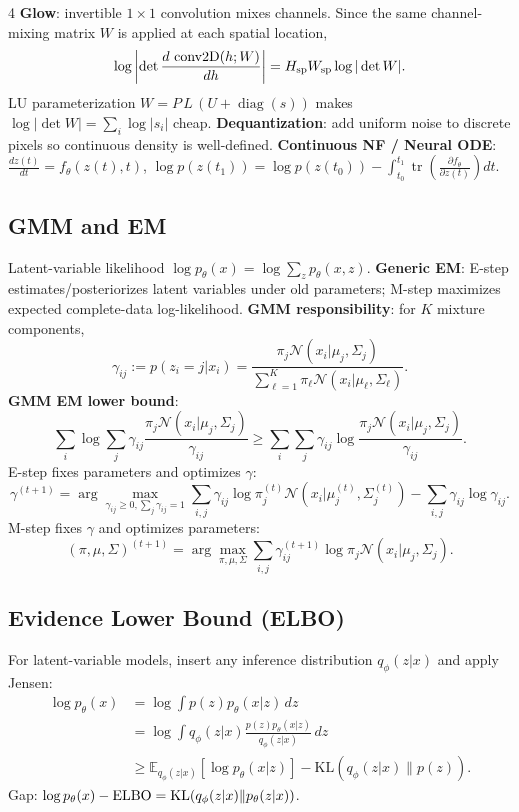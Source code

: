 \documentclass{article}
\newcommand{\key}[1]{\textbf{#1}}
\newcommand{\E}{\mathbb{E}}
\newcommand{\N}{\mathcal{N}}
\newcommand{\KL}{\mathrm{KL}}
\newcommand{\1}{\mathbf 1}
\DeclareMathOperator{\tr}{tr}
\begin{document}
\begin{multicols*}{4}
\key{Glow}: invertible $1\times1$ convolution mixes channels. Since the same channel-mixing matrix $W$ is applied at each spatial location,
\[
\log\left|\det\frac{d\,\operatorname{conv2D}(h;W)}{dh}\right|
=H_{\rm sp}W_{\rm sp}\log|\det W|.
\]
LU parameterization $W=P\,L\,(U+\operatorname{diag}(s))$ makes
$\log|\det W|=\sum_i\log|s_i|$ cheap. \key{Dequantization}: add uniform noise to discrete pixels so continuous density is well-defined.
\key{Continuous NF / Neural ODE}: $\frac{dz(t)}{dt}=f_\theta(z(t),t)$,
\(
\log p(z(t_1))=\log p(z(t_0))-\int_{t_0}^{t_1}\tr\left(\frac{\partial f_\theta}{\partial z(t)}\right)dt.
\)

\subsection{GMM and EM}
Latent-variable likelihood $\log p_\theta(x)=\log\sum_z p_\theta(x,z)$. \key{Generic EM}: E-step estimates/posteriorizes latent variables under old parameters; M-step maximizes expected complete-data log-likelihood.
\key{GMM responsibility}: for $K$ mixture components,
\[
\gamma_{ij}:=p(z_i=j|x_i)=
\frac{\pi_j\N(x_i|\mu_j,\Sigma_j)}
{\sum_{\ell=1}^{K}\pi_\ell\N(x_i|\mu_\ell,\Sigma_\ell)}.
\]
\key{GMM EM lower bound}:
\[
\sum_i\log\sum_j\gamma_{ij}
\frac{\pi_j\N(x_i|\mu_j,\Sigma_j)}{\gamma_{ij}}
\ge
\sum_i\sum_j\gamma_{ij}\log
\frac{\pi_j\N(x_i|\mu_j,\Sigma_j)}{\gamma_{ij}}.
\]
E-step fixes parameters and optimizes $\gamma$:
\[
\gamma^{(t+1)}=\arg\max_{\gamma_{ij}\ge0,\sum_j\gamma_{ij}=1}
\sum_{i,j}\gamma_{ij}\log\pi_j^{(t)}\N(x_i|\mu_j^{(t)},\Sigma_j^{(t)})
-\sum_{i,j}\gamma_{ij}\log\gamma_{ij}.
\]
M-step fixes $\gamma$ and optimizes parameters:
\[
(\pi,\mu,\Sigma)^{(t+1)}
=\arg\max_{\pi,\mu,\Sigma}\sum_{i,j}\gamma_{ij}^{(t+1)}
\log\pi_j\N(x_i|\mu_j,\Sigma_j).
\]

\subsection{Evidence Lower Bound (ELBO)}
For latent-variable models, insert any inference distribution $q_\phi(z|x)$ and apply Jensen:
\[
\begin{aligned}
\log p_\theta(x)
&=\log\int p(z)p_\theta(x|z)\,dz\\
&=\log\int q_\phi(z|x)\frac{p(z)p_\theta(x|z)}{q_\phi(z|x)}\,dz\\
&\ge \E_{q_\phi(z|x)}[\log p_\theta(x|z)]-\KL(q_\phi(z|x)\|p(z)).
\end{aligned}
\]
Gap: $\log p_\theta(x)-{\rm ELBO}=\KL(q_\phi(z|x)\|p_\theta(z|x))$.


\end{multicols*}
\end{document}
